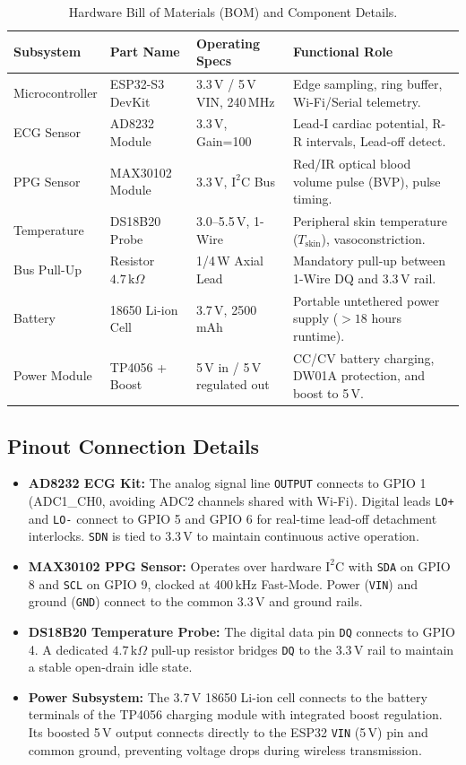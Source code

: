 \documentclass[11pt,a4paper]{article}
\begin{document}
\begin{table}[htbp]
\centering
\caption{Hardware Bill of Materials (BOM) and Component Details.}
\label{tab:bom}
\small
\begin{tabularx}{\textwidth}{p{3.2cm} p{2.8cm} p{2.5cm} X}
\toprule
\textbf{Subsystem} & \textbf{Part Name} & \textbf{Operating Specs} & \textbf{Functional Role} \\
\midrule
Microcontroller & ESP32-S3 DevKit & 3.3\,V / 5\,V VIN, 240\,MHz & Edge sampling, ring buffer, Wi-Fi/Serial telemetry. \\
ECG Sensor & AD8232 Module & 3.3\,V, Gain=100 & Lead-I cardiac potential, R-R intervals, Lead-off detect. \\
PPG Sensor & MAX30102 Module & 3.3\,V, $\text{I}^2\text{C}$ Bus & Red/IR optical blood volume pulse (BVP), pulse timing. \\
Temperature & DS18B20 Probe & 3.0--5.5\,V, 1-Wire & Peripheral skin temperature ($T_{\text{skin}}$), vasoconstriction. \\
Bus Pull-Up & Resistor $4.7\,\text{k}\Omega$ & 1/4\,W Axial Lead & Mandatory pull-up between 1-Wire DQ and 3.3\,V rail. \\
Battery & 18650 Li-ion Cell & 3.7\,V, 2500\,mAh & Portable untethered power supply ($> 18$ hours runtime). \\
Power Module & TP4056 + Boost & 5\,V in / 5\,V regulated out & CC/CV battery charging, DW01A protection, and boost to 5\,V. \\
\bottomrule
\end{tabularx}
\end{table}

\subsection{Pinout Connection Details}
\begin{itemize}
    \item \textbf{AD8232 ECG Kit:} The analog signal line \texttt{OUTPUT} connects to GPIO 1 (ADC1\_CH0, avoiding ADC2 channels shared with Wi-Fi). Digital leads \texttt{LO+} and \texttt{LO-} connect to GPIO 5 and GPIO 6 for real-time lead-off detachment interlocks. \texttt{SDN} is tied to 3.3\,V to maintain continuous active operation.
    \item \textbf{MAX30102 PPG Sensor:} Operates over hardware $\text{I}^2\text{C}$ with \texttt{SDA} on GPIO 8 and \texttt{SCL} on GPIO 9, clocked at 400\,kHz Fast-Mode. Power (\texttt{VIN}) and ground (\texttt{GND}) connect to the common 3.3\,V and ground rails.
    \item \textbf{DS18B20 Temperature Probe:} The digital data pin \texttt{DQ} connects to GPIO 4. A dedicated $4.7\,\text{k}\Omega$ pull-up resistor bridges \texttt{DQ} to the 3.3\,V rail to maintain a stable open-drain idle state.
    \item \textbf{Power Subsystem:} The 3.7\,V 18650 Li-ion cell connects to the battery terminals of the TP4056 charging module with integrated boost regulation. Its boosted 5\,V output connects directly to the ESP32 \texttt{VIN} (5\,V) pin and common ground, preventing voltage drops during wireless transmission.
\end{itemize}
\end{document}
